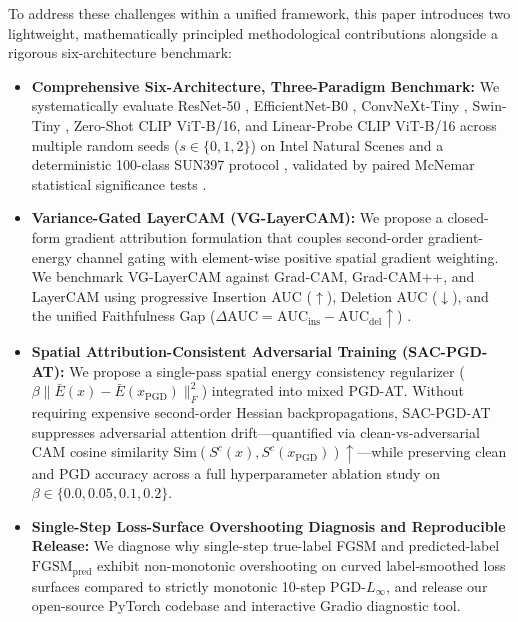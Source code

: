 \documentclass[final,5p,times,twocolumn]{elsarticle}
\begin{document}
To address these challenges within a unified framework, this paper introduces two lightweight, mathematically principled methodological contributions alongside a rigorous six-architecture benchmark:
\begin{itemize}
    \item \textbf{Comprehensive Six-Architecture, Three-Paradigm Benchmark:} We systematically evaluate ResNet-50 \cite{he2016deep}, EfficientNet-B0 \cite{tan2019efficientnet}, ConvNeXt-Tiny \cite{liu2022convnet}, Swin-Tiny \cite{liu2021swin}, Zero-Shot CLIP ViT-B/16, and Linear-Probe CLIP ViT-B/16 \cite{radford2021learning} across multiple random seeds ($s \in \{0, 1, 2\}$) on Intel Natural Scenes and a deterministic 100-class SUN397 protocol \cite{xiao2010sun}, validated by paired McNemar statistical significance tests \cite{mcnemar1947note}.
    \item \textbf{Variance-Gated LayerCAM (VG-LayerCAM):} We propose a closed-form gradient attribution formulation that couples second-order gradient-energy channel gating with element-wise positive spatial gradient weighting. We benchmark VG-LayerCAM against Grad-CAM, Grad-CAM++, and LayerCAM using progressive Insertion AUC ($\uparrow$), Deletion AUC ($\downarrow$), and the unified Faithfulness Gap ($\Delta\text{AUC} = \text{AUC}_{\text{ins}} - \text{AUC}_{\text{del}} \uparrow$) \cite{petsiuk2018rise,samek2016evaluating}.
    \item \textbf{Spatial Attribution-Consistent Adversarial Training (SAC-PGD-AT):} We propose a single-pass spatial energy consistency regularizer ($\beta \|\bar{E}(x) - \bar{E}(x_{\text{PGD}})\|_F^2$) integrated into mixed PGD-AT. Without requiring expensive second-order Hessian backpropagations, SAC-PGD-AT suppresses adversarial attention drift---quantified via clean-vs-adversarial CAM cosine similarity $\text{Sim}(S^c(x), S^c(x_{\text{PGD}})) \uparrow$---while preserving clean and PGD accuracy across a full hyperparameter ablation study on $\beta \in \{0.0, 0.05, 0.1, 0.2\}$.
    \item \textbf{Single-Step Loss-Surface Overshooting Diagnosis and Reproducible Release:} We diagnose why single-step true-label FGSM and predicted-label $\text{FGSM}_{\text{pred}}$ exhibit non-monotonic overshooting on curved label-smoothed loss surfaces \cite{kurakin2017adversarial} compared to strictly monotonic 10-step $\text{PGD-}L_\infty$, and release our open-source PyTorch codebase and interactive Gradio diagnostic tool.
\end{itemize}
\end{document}
